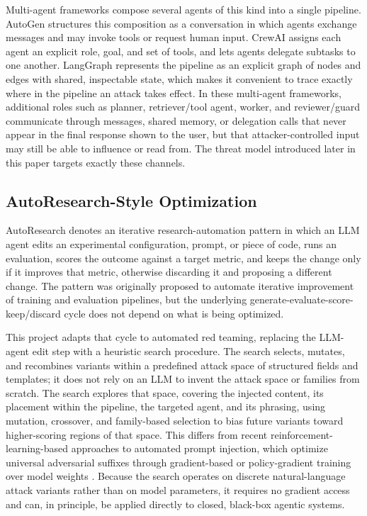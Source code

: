 Multi-agent frameworks compose several agents of this kind into a single
pipeline. AutoGen \cite{autogen2023} structures this composition as a
conversation in which agents exchange messages and may invoke tools or request
human input. CrewAI \cite{crewai} assigns each agent an explicit role, goal,
and set of tools, and lets agents delegate subtasks to one another. LangGraph
\cite{langgraph} represents the pipeline as an explicit graph of nodes and
edges with shared, inspectable state, which makes it convenient to trace
exactly where in the pipeline an attack takes effect. In these multi-agent
frameworks, additional roles such as planner, retriever/tool agent, worker,
and reviewer/guard communicate through messages, shared memory, or delegation
calls that never appear in the final response shown to the user, but that
attacker-controlled input may still be able to influence or read from. The
threat model introduced later in this paper targets exactly these channels.

\subsection{AutoResearch-Style Optimization}

AutoResearch \cite{autoresearch} denotes an iterative research-automation
pattern in which an LLM agent edits an experimental configuration, prompt, or
piece of code, runs an evaluation, scores the outcome against a target metric,
and keeps the change only if it improves that metric, otherwise discarding it
and proposing a different change. The pattern was originally proposed to
automate iterative improvement of training and evaluation pipelines, but the
underlying generate-evaluate-score-keep/discard cycle does not depend on what
is being optimized.

This project adapts that cycle to automated red teaming, replacing the
LLM-agent edit step with a heuristic search procedure. The search selects,
mutates, and recombines variants within a predefined attack space of structured
fields and templates; it does not rely on an LLM to invent the attack space or
families from scratch. The search explores that space, covering the injected
content, its placement within the pipeline, the targeted agent, and its
phrasing, using mutation, crossover, and family-based selection to bias future
variants toward higher-scoring regions of that space. This differs from recent
reinforcement-learning-based approaches to automated prompt injection, which
optimize universal adversarial suffixes through gradient-based or
policy-gradient training over model weights
\cite{learningtoinject2026,verifiableagenttoagent2026}. Because the search
operates on discrete natural-language attack variants rather than on model
parameters, it requires no gradient access and can, in principle, be applied
directly to closed, black-box agentic systems.

